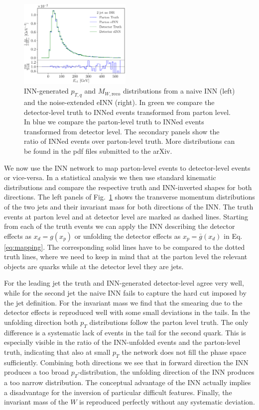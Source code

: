 \begin{figure}[t]
\includegraphics[page=32, width=0.48\textwidth]{figures/cINN/INN_FineTune}
\caption{INN-generated $p_{T,q}$ and $M_{W,\text{reco}}$ distributions from a
  naive INN (left) and the noise-extended eINN (right). In green we
  compare the detector-level truth to INNed events transformed from
  parton level. In blue we compare the parton-level truth to INNed
  events transformed from detector level. The secondary panels show
  the ratio of INNed events over parton-level truth. More
  distributions can be found in the pdf files submitted to the arXiv.}
\label{fig:UnfoldCurve}
\end{figure}

We now use the INN network to map parton-level events to
detector-level events or vice-versa. In a statistical analysis we then
use standard kinematic distributions and compare the respective truth
and INN-inverted shapes for both directions. The left panels of
Fig.~\ref{fig:UnfoldCurve} shows the transverse momentum distributions
of the two jets and their invariant mass for both directions of the
INN. The truth events at parton level and at detector level are marked
as dashed lines. Starting from each of the truth events we can apply
the INN describing the detector effects as $x_d = g(x_p)$ or unfolding
the detector effects as $x_p = \bar{g}(x_d)$ in
Eq.\eqref{eq:mapping}. The corresponding solid lines have to be
compared to the dotted truth lines, where we need to keep in mind that
at the parton level the relevant objects are quarks while at the
detector level they are jets.

For the leading jet the truth and INN-generated detector-level agree very
well, while for the second jet the naive INN fails to capture the hard
cut imposed by the jet definition. 
For the invariant mass we find that
the smearing due to the detector effects is reproduced well with some
small deviations in the tails. In the unfolding direction both $p_T$
distributions follow the parton level truth. The only difference is a
systematic lack of events in the tail for the second quark. This is
especially visible in the ratio of the INN-unfolded events and the
parton-level truth, indicating that also at small $p_T$ the network
does not fill the phase space sufficiently. Combining both directions
we see that in forward direction the INN produces a too broad
$p_T$-distribution, the unfolding direction of the INN produces a too
narrow distribution.  The conceptual advantage of the INN actually
implies a disadvantage for the inversion of particular difficult
features.  Finally, the invariant mass of the $W$ is reproduced
perfectly without any systematic deviation.

